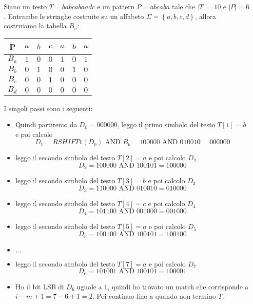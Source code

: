 \begin{esempio}
    Siano un testo $T=babcabaadc$ e un pattern $P=abcaba$ tale che $|T| = 10$ e $|P|=6$.
    Entrambe le stringhe costruite su un alfabeto $\Sigma=\left\{a,b,c,d\right\}$,
    allora costruiamo la tabella $B_\sigma$:
    \begin{table}[!ht]
        \centering
        \begin{tabular}{|c|c|c|c|c|c|c|}
            \hline
            P     & $a$ & $b$ & $c$ & $a$ & $b$ & $a$ \\ \hline
            $B_a$ & $1$ & $0$ & $0$ & $1$ & $0$ & $1$ \\ \hline
            $B_b$ & $0$ & $1$ & $0$ & $0$ & $1$ & $0$ \\ \hline
            $B_c$ & $0$ & $0$ & $1$ & $0$ & $0$ & $0$ \\ \hline
            $B_d$ & $0$ & $0$ & $0$ & $0$ & $0$ & $0$ \\ \hline
        \end{tabular}
    \end{table}
    I singoli passi sono i seguenti:
    \begin{itemize}
        \item Quindi partiremo da $D_0 = 000000$, leggo il primo simbolo del testo $T[1] = b$ e poi calcolo
              $$D_1=RSHIFT1(D_{0}) \text{ AND } B_b = 100000 \text{ AND } 010010 = 000000$$
        \item leggo il secondo simbolo del testo $T[2] = a$ e poi calcolo $D_2$
              $$D_2 = 100000 \text{ AND } 100101 = 100000 $$
        \item leggo il secondo simbolo del testo $T[3] = b$ e poi calcolo $D_3$
              $$D_3 = 110000 \text{ AND } 010010 = 010000 $$
        \item leggo il secondo simbolo del testo $T[4] = c$ e poi calcolo $D_4$
              $$D_4 = 101100 \text{ AND } 001000 = 001000 $$
        \item leggo il secondo simbolo del testo $T[5] = a$ e poi calcolo $D_5$
              $$D_5 = 100100 \text{ AND } 100101 = 100100 $$
        \item $\dots$
        \item leggo il secondo simbolo del testo $T[7] = a$ e poi calcolo $D_7$
              $$D_6 = 101001 \text{ AND } 100101 = 100001 $$
        \item Ho il bit LSB di $D_6$ uguale a $1$, quindi ho trovato un match che
              corrisponde a $i-m+1 =7-6+1= 2$. Poi continuo fino a quando non termino $T$.
    \end{itemize}
\end{esempio}

